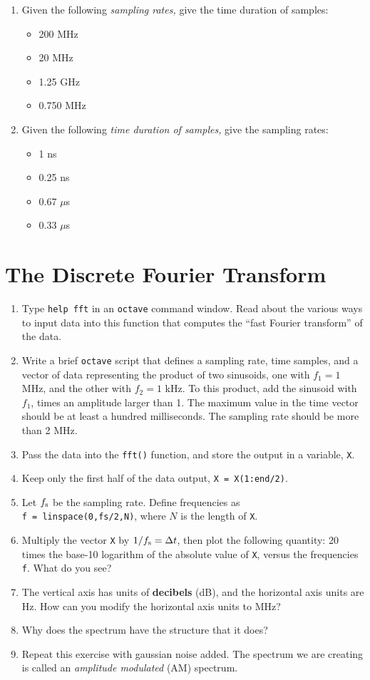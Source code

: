 \documentclass{article}
\begin{document}
\begin{enumerate}
\item Given the following \textit{sampling rates,} give the time duration of samples:
\begin{itemize}
\item 200 MHz
\item 20 MHz
\item 1.25 GHz
\item 0.750 MHz
\end{itemize}
\item Given the following \textit{time duration of samples,} give the sampling rates:
\begin{itemize}
\item 1 ns
\item 0.25 ns
\item 0.67 $\mu$s
\item 0.33 $\mu$s
\end{itemize}
\end{enumerate}

\section{The Discrete Fourier Transform}

\begin{enumerate}
\item Type \verb+help fft+ in an \verb+octave+ command window.  Read about the various ways to input data into this function that computes the ``fast Fourier transform'' of the data.
\item Write a brief \verb+octave+ script that defines a sampling rate, time samples, and a vector of data representing the product of two sinusoids, one with $f_1 = 1$ MHz, and the other with $f_2 = 1$ kHz.  To this product, add the sinusoid with $f_1$, times an amplitude larger than 1.  The maximum value in the time vector should be at least a hundred milliseconds.  The sampling rate should be more than 2 MHz.
\item Pass the data into the \verb+fft()+ function, and store the output in a variable, \verb+X+.
\item Keep only the first half of the data output, \verb+X = X(1:end/2)+.
\item Let $f_{\rm s}$ be the sampling rate.  Define frequencies as \\ \verb+f = linspace(0,fs/2,N)+, where $N$ is the length of \verb+X+.
\item Multiply the vector \verb+X+ by $1/f_{\rm s} = \Delta t$, then plot the following quantity: 20 times the base-10 logarithm of the absolute value of \verb+X+, versus the frequencies \verb+f+. What do you see?
\item The vertical axis has units of \textbf{decibels} (dB), and the horizontal axis units are Hz.  How can you modify the horizontal axis units to MHz?
\item Why does the spectrum have the structure that it does?
\item Repeat this exercise with gaussian noise added.  The spectrum we are creating is called an \textit{amplitude modulated} (AM) spectrum.
\end{enumerate}
\end{document}
